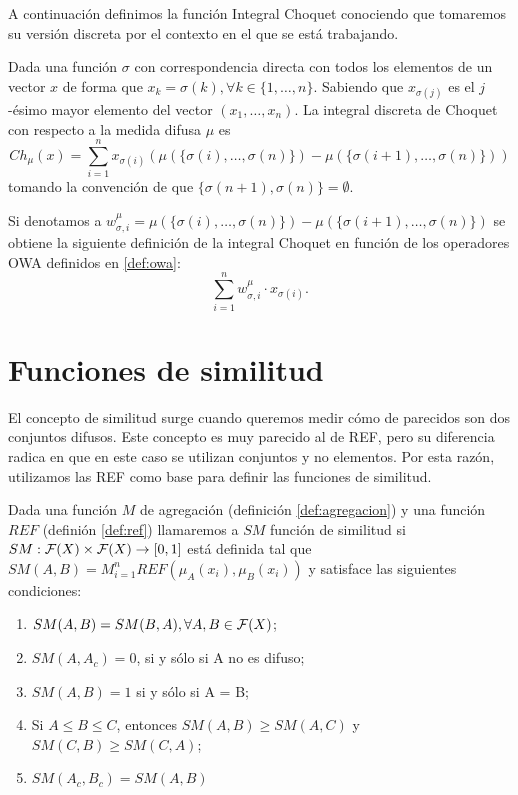 A continuación definimos la función Integral Choquet conociendo que tomaremos su versión discreta por el contexto en el que se está trabajando.

\begin{definition}\label{def:choquet}
Dada una función $\sigma$  con correspondencia directa con todos los elementos de un vector $x$ de forma que $x_{k}=\sigma(k), \forall k\in\{1,\dots,n\}$. Sabiendo que $x_{\sigma(j)}$ es el $j$-ésimo mayor elemento del vector $(x_{1},\dots,x_{n})$. La integral discreta de Choquet con respecto a la medida difusa $\mu$ es 
$$Ch_{\mu}(x)=\sum_{i=1}^{n}x_{\sigma(i)}(\mu(\{\sigma(i),\dots,\sigma(n)\})-\mu(\{\sigma(i+1),\dots,\sigma(n)\}))$$
tomando la convención de que $\{\sigma(n+1),\sigma(n)\}=\emptyset$.
\end{definition}

\begin{proposition}\label{prop:choque2owa}
Si denotamos a $w_{\sigma, i}^{\mu} = \mu(\{\sigma(i),\dots,\sigma(n)\})-\mu(\{\sigma(i+1),\dots,\sigma(n)\})$ se obtiene la siguiente definición de la integral Choquet en función de los operadores OWA definidos en \ref{def:owa}:
$$\sum_{i=1}^{n} w_{\sigma, i}^{\mu} \cdot x_{\sigma(i)}.$$
\end{proposition}


\section{Funciones de similitud}\label{sec:similitud}
El concepto de similitud \cite{art:fan1, art:fan2} surge cuando queremos medir cómo de parecidos son dos conjuntos difusos. Este concepto es muy parecido al de REF, pero su diferencia radica en que en este caso se utilizan conjuntos y no elementos. Por esta razón, utilizamos las REF como base para definir las funciones de similitud.
\begin{definition}\label{def:similitud}
Dada una función $M$ de agregación (definición \ref{def:agregacion}) y una función $REF$ (definión \ref{def:ref}) llamaremos a $SM$ función de similitud si $SM : \mathcal{F}(X) \times \mathcal{F}(X) \rightarrow [0,1]$ está definida tal que $SM(A,B)=M^n_{i=1}REF(\mu_A(x_i), \mu_B(x_i))$
y satisface las siguientes condiciones:
	\begin{enumerate}
	\item $SM(A, B) = SM(B, A), \forall A, B \in \mathcal{F}(X)$;
	\item $SM(A, A_c) = 0$, si y sólo si A no es difuso;
	\item $SM(A, B) = 1$ si y sólo si A = B;
	\item Si $A\leq B\leq C$, entonces $SM(A, B)\geq SM(A,C)$ y $SM(C, B)\geq SM(C,A)$;
	\item $SM(A_c, B_c) = SM(A,B)$
	\end{enumerate}	
\end{definition}

